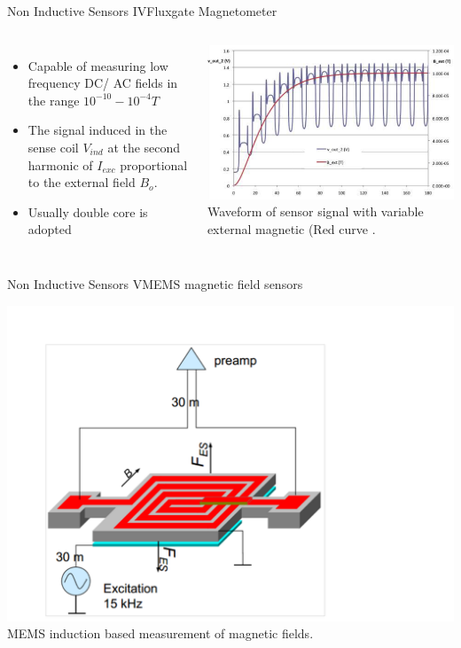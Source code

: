 \documentclass{beamer}
\begin{document}
\begin{frame}{Non Inductive Sensors IV}{Fluxgate Magnetometer}
	\begin{columns}
		\begin{itemize}
			\item Capable of measuring  low frequency DC/ AC fields in the range $10^{-10 }- 10^{-4} T$
			\item  The signal induced in the sense coil $V_{ind}$  at the second harmonic of $I_{exc} $ proportional to the external field $B_{o}$.
			\item Usually double core is adopted
		\end{itemize}
		\begin{center}
			\includegraphics[width=0.95 \columnwidth]{figures/aprillesignal.png}\\
		{\small Waveform of sensor signal with variable external magnetic (Red curve .}
	\end{center}
	\end{columns}
\end{frame}


 \begin{frame}{Non Inductive Sensors V}{MEMS magnetic field sensors}
	\begin{center}
		\includegraphics[width=0.8 \columnwidth]{mems.pdf}
		{\tiny  MEMS induction based measurement of magnetic fields.}
	\end{center}
\end{frame}
\end{document}
